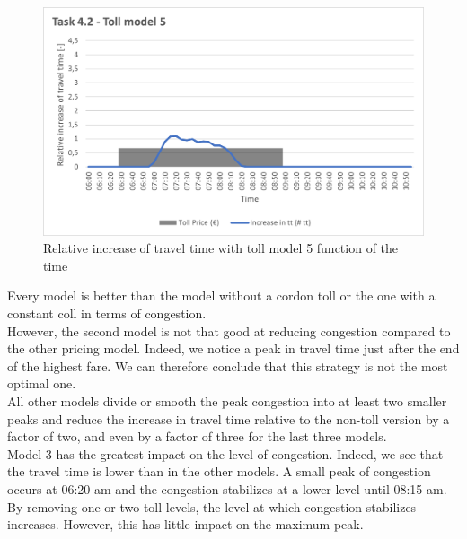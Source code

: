 \documentclass[a4paper, 12pt,oneside]{article}
\begin{document}
\begin{minipage}[c]{0.5\textwidth}
\begin{figure}[H]
    \centering
    \includegraphics[width=1\textwidth]{Images/Step4/Task4.2_Toll_model_5.png}
    \caption{Relative increase of travel time with toll model 5 function of the time}
    \label{fig:Relative increase of travel time with toll model 5 function of the time}
\end{figure}
\end{minipage}
\newline

Every model is better than the model without a cordon toll or the one with a constant coll in terms of congestion.\\

However, the second model is not that good at reducing congestion compared to the other pricing model. Indeed, we notice a peak in travel time just after the end of the highest fare. We can therefore conclude that this strategy is not the most optimal one.\\

All other models divide or smooth the peak congestion into at least two smaller peaks and reduce the increase in travel time relative to the non-toll version by a factor of two, and even by a factor of three for the last three models.\\

Model 3 has the greatest impact on the level of congestion. Indeed, we see that the travel time is lower than in the other models. A small peak of congestion occurs at 06:20 am and the congestion stabilizes at a lower level until 08:15 am.\\

By removing one or two toll levels, the level at which congestion stabilizes increases. However, this has little impact on the maximum peak.\\
\end{document}
